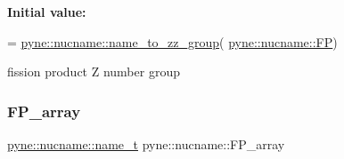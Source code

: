{\bfseries Initial value\+:}
\begin{DoxyCode}
= 
  \hyperlink{namespacepyne_1_1nucname_a0f6bd8d281ff5aa5fd5b48e16b867062}{pyne::nucname::name\_to\_zz\_group}(
      \hyperlink{namespacepyne_1_1nucname_ac2ae7f6893d6871fde8b78a928e6f2c5}{pyne::nucname::FP})
\end{DoxyCode}


fission product Z number group 

\mbox{\label{namespacepyne_1_1nucname_a57a7016ca0ac1283ab5ca3fce0230114}} 
\subsubsection{\texorpdfstring{F\+P\+\_\+array}{FP\_array}}
{\footnotesize\ttfamily \hyperlink{namespacepyne_1_1nucname_aed6b656cde69b79b33f6af37fabb2054}{pyne\+::nucname\+::name\+\_\+t} pyne\+::nucname\+::\+F\+P\+\_\+array}

